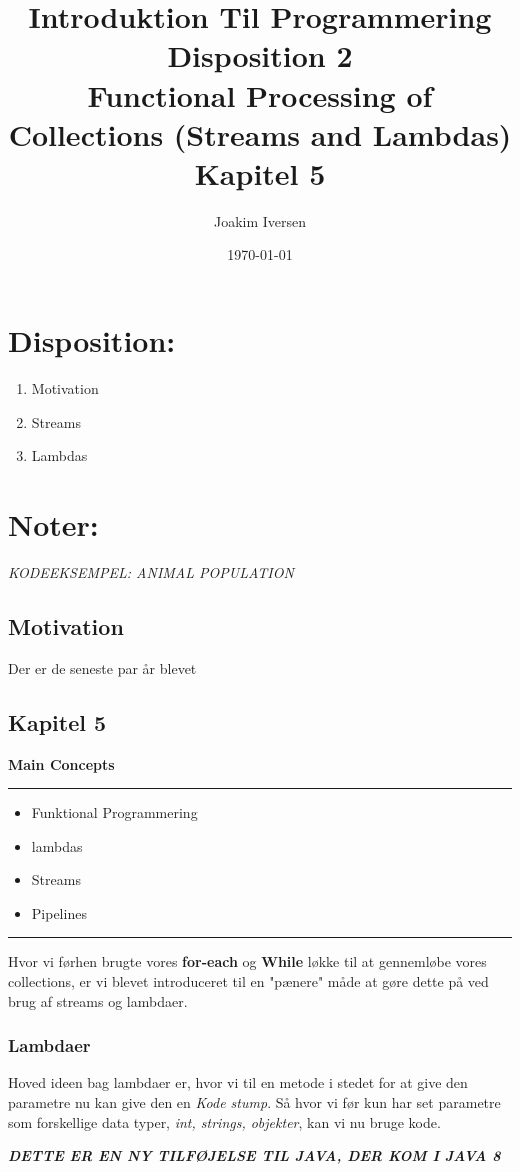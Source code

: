 \documentclass{article}
\title{Introduktion Til Programmering
        Disposition 2 \\
        Functional Processing of Collections (Streams and Lambdas) \\
        Kapitel 5}
\author{Joakim Iversen}
\date{\today}
\begin{document}
    \maketitle
\newpage

\section*{Disposition:}
\begin{enumerate}
    \item Motivation
    \item Streams
    \item Lambdas
\end{enumerate}
\newpage

\section*{Noter:}
\begin{center}
    \textit{KODEEKSEMPEL: ANIMAL POPULATION}
\end{center}

\subsection*{Motivation}
Der er de seneste par år blevet 

\subsection*{Kapitel 5}

\textbf{Main Concepts}
\hrule \vspace{0.3em}
\begin{itemize}
    \item Funktional Programmering
    \item lambdas
    \item Streams
    \item Pipelines
\end{itemize}
\hrule \vspace{0.3em}

Hvor vi førhen brugte vores \textbf{for-each} og \textbf{While} løkke til at gennemløbe vores collections, er vi blevet introduceret til en "pænere" måde at gøre dette på ved brug af streams og lambdaer.

\subsubsection*{Lambdaer}
Hoved ideen bag lambdaer er, hvor vi til en metode i stedet for at give den parametre nu kan give den en \textit{Kode stump}. Så hvor vi før kun har set parametre som forskellige data typer, \textit{int, strings, objekter}, kan vi nu bruge kode. 
\begin{center}
    \textit{\textbf{DETTE ER EN NY TILFØJELSE TIL JAVA, DER KOM I JAVA 8}}
\end{center} 
\end{document}
